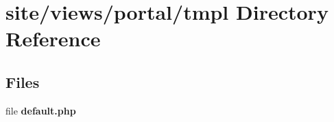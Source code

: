 \section{site/views/portal/tmpl Directory Reference}
\label{dir_24eaead11cd52ac92dabef7da7b79a11}
\subsection*{Files}
\begin{DoxyCompactItemize}
\item 
file \textbf{ default.\+php}
\end{DoxyCompactItemize}
